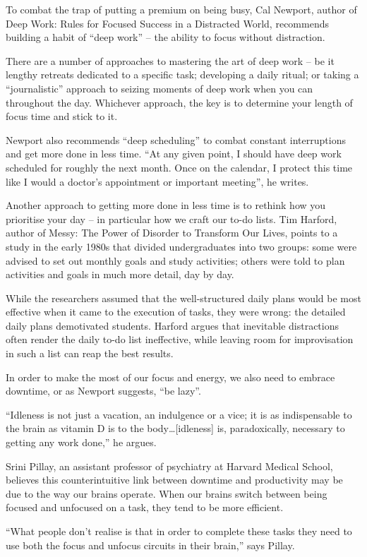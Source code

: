 To combat the trap of putting a premium on being busy, Cal Newport, author of Deep Work: Rules for Focused Success in a Distracted World, recommends building a habit of ``deep work'' – the ability to focus without distraction.


There are a number of approaches to mastering the art of deep work – be it lengthy retreats dedicated to a specific task; developing a daily ritual; or taking a ``journalistic'' approach to seizing moments of deep work when you can throughout the day. Whichever approach, the key is to determine your length of focus time and stick to it.


Newport also recommends ``deep scheduling'' to combat constant interruptions and get more done in less time. ``At any given point, I should have deep work scheduled for roughly the next month. Once on the calendar, I protect this time like I would a doctor's appointment or important meeting'', he writes.


Another approach to getting more done in less time is to rethink how you prioritise your day – in particular how we craft our to-do lists. Tim Harford, author of Messy: The Power of Disorder to Transform Our Lives, points to a study in the early 1980s that divided undergraduates into two groups: some were advised to set out monthly goals and study activities; others were told to plan activities and goals in much more detail, day by day.


While the researchers assumed that the well-structured daily plans would be most effective when it came to the execution of tasks, they were wrong: the detailed daily plans demotivated students. Harford argues that inevitable distractions often render the daily to-do list ineffective, while leaving room for improvisation in such a list can reap the best results.


In order to make the most of our focus and energy, we also need to embrace downtime, or as Newport suggests, ``be lazy''.


``Idleness is not just a vacation, an indulgence or a vice; it is as indispensable to the brain as vitamin D is to the body…[idleness] is, paradoxically, necessary to getting any work done,'' he argues.


Srini Pillay, an assistant professor of psychiatry at Harvard Medical School, believes this counterintuitive link between downtime and productivity may be due to the way our brains operate. When our brains switch between being focused and unfocused on a task, they tend to be more efficient.


``What people don't realise is that in order to complete these tasks they need to use both the focus and unfocus circuits in their brain,'' says Pillay.
